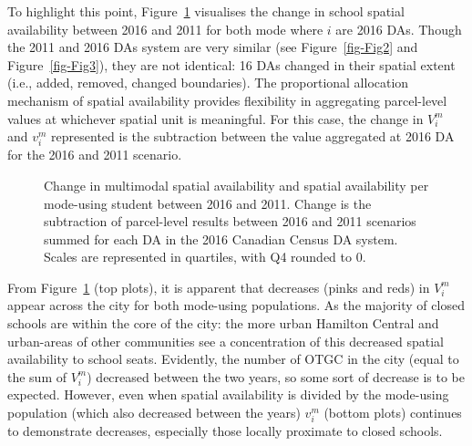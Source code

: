 \documentclass[
default
]{sn-jnl}
\begin{document}
To highlight this point, Figure~\ref{fig-Fig6} visualises the change in
school spatial availability between 2016 and 2011 for both mode where
\(i\) are 2016 DAs. Though the 2011 and 2016 DAs system are very similar
(see Figure~\ref{fig-Fig2} and Figure~\ref{fig-Fig3}), they are not
identical: 16 DAs changed in their spatial extent (i.e., added, removed,
changed boundaries). The proportional allocation mechanism of spatial
availability provides flexibility in aggregating parcel-level values at
whichever spatial unit is meaningful. For this case, the change in
\(V_i^m\) and \(v_i^m\) represented is the subtraction between the value
aggregated at 2016 DA for the 2016 and 2011 scenario.

\begin{figure}[H]


\caption{\label{fig-Fig6}Change in multimodal spatial availability and
spatial availability per mode-using student between 2016 and 2011.
Change is the subtraction of parcel-level results between 2016 and 2011
scenarios summed for each DA in the 2016 Canadian Census DA system.
Scales are represented in quartiles, with Q4 rounded to 0.}

\end{figure}%

From Figure~\ref{fig-Fig6} (top plots), it is apparent that decreases
(pinks and reds) in \(V_i^m\) appear across the city for both mode-using
populations. As the majority of closed schools are within the core of
the city: the more urban Hamilton Central and urban-areas of other
communities see a concentration of this decreased spatial availability
to school seats. Evidently, the number of OTGC in the city (equal to the
sum of \(V_i^m\)) decreased between the two years, so some sort of
decrease is to be expected. However, even when spatial availability is
divided by the mode-using population (which also decreased between the
years) \(v_i^m\) (bottom plots) continues to demonstrate decreases,
especially those locally proximate to closed schools.
\end{document}
